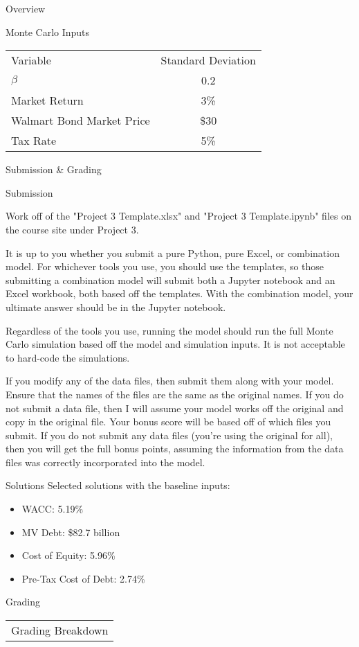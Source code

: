 \documentclass[]{article}
\begin{document}
\begin{section}{Overview}
\begin{subsection}{Monte Carlo Inputs}
\begin{center}
\begin{tabular}{l|c}
\toprule
Variable & Standard Deviation\\

\cmidrule(lr){1-2}
$\beta$ & 0.2\\
Market Return & 3\%\\
Walmart Bond Market Price & \$30\\
Tax Rate & 5\%\\

\bottomrule
\end{tabular}
\end{center}
\label{mc-inputs}
\end{subsection}
\end{section}
\begin{section}{Submission \& Grading}
\begin{subsection}{Submission}

Work off of the "Project 3 Template.xlsx" and "Project 3 Template.ipynb" files on the course site under Project 3.

It is up to you whether you submit a pure Python, pure Excel, or combination model. For whichever tools
you use, you should use the templates, so those submitting a combination model will submit both a Jupyter notebook
and an Excel workbook, both based off the templates. With the combination model, your ultimate answer should be
in the Jupyter notebook.

Regardless of the tools you use, running the model should run the full Monte Carlo simulation based off the
model and simulation inputs. It is not acceptable to hard-code the simulations.

If you modify any of the data files, then submit them along with your model. Ensure that the names of
the files are the same as the original names. If you do not submit a data file, then I will assume your model
works off the original and copy in the original file. Your bonus score will be based off of which files you submit.
If you do not submit any data files (you're using the original for all), then you will get the full bonus points,
assuming the information from the data files was correctly incorporated into the model.

\end{subsection}
\begin{subsection}{Solutions}
Selected solutions with the baseline inputs:
\begin{itemize}
\item WACC: 5.19\%
\item MV Debt: \$82.7 billion
\item Cost of Equity: 5.96\%
\item Pre-Tax Cost of Debt: 2.74\%
\end{itemize}
\end{subsection}
\begin{subsection}{Grading}
\begin{center}
\begin{tabular}{l|c}
\multicolumn{2}{c}{Grading Breakdown}\\


\end{tabular}
\end{center}
\end{subsection}
\end{section}
\end{document}
